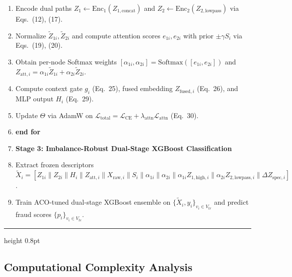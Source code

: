 \documentclass[10pt,a4paper,twocolumn]{article}
\begin{document}
{\begin{enumerate}
  \item \hspace{8pt} Encode dual paths $Z_1 \leftarrow \text{Enc}_1(Z_{1,\text{concat}})$ and $Z_2 \leftarrow \text{Enc}_2(Z_{2,\text{lowpass}})$ via Eqs.\ (12), (17).
  \item \hspace{8pt} Normalize $\tilde{Z}_{1i}, \tilde{Z}_{2i}$ and compute attention scores $e_{1i}, e_{2i}$ with prior $\pm \gamma S_i$ via Eqs.\ (19), (20).
  \item \hspace{8pt} Obtain per-node Softmax weights $[\alpha_{1i}, \alpha_{2i}] = \text{Softmax}([e_{1i}, e_{2i}])$ and $Z_{\text{att},i} = \alpha_{1i}\tilde{Z}_{1i} + \alpha_{2i}\tilde{Z}_{2i}$.
  \item \hspace{8pt} Compute context gate $g_i$ (Eq.\ 25), fused embedding $Z_{\text{fused},i}$ (Eq.\ 26), and MLP output $H_i$ (Eq.\ 29).
  \item \hspace{8pt} Update $\Theta$ via AdamW on $\mathcal{L}_{\text{total}} = \mathcal{L}_{\text{CE}} + \lambda_{\text{attn}}\mathcal{L}_{\text{attn}}$ (Eq.\ 30).
  \item \textbf{end for}
  \item \textbf{Stage 3: Imbalance-Robust Dual-Stage XGBoost Classification}
  \item Extract frozen descriptors $\tilde{X}_i = [Z_{1i} \parallel Z_{2i} \parallel H_i \parallel Z_{\text{att},i} \parallel X_{\text{raw},i} \parallel S_i \parallel \alpha_{1i} \parallel \alpha_{2i} \parallel \alpha_{1i}Z_{1,\text{high},i} \parallel \alpha_{2i}Z_{2,\text{lowpass},i} \parallel \Delta Z_{\text{spec},i}]$.
  \item Train ACO-tuned dual-stage XGBoost ensemble on $\{\tilde{X}_i, y_i\}_{v_i \in V_{tr}}$ and predict fraud scores $\{p_i\}_{v_i \in V_{te}}$.
\end{enumerate}
\par\vspace{4pt}
\hrule height 0.8pt
\vspace{4pt}
}

\subsection{Computational Complexity Analysis}
\end{document}
